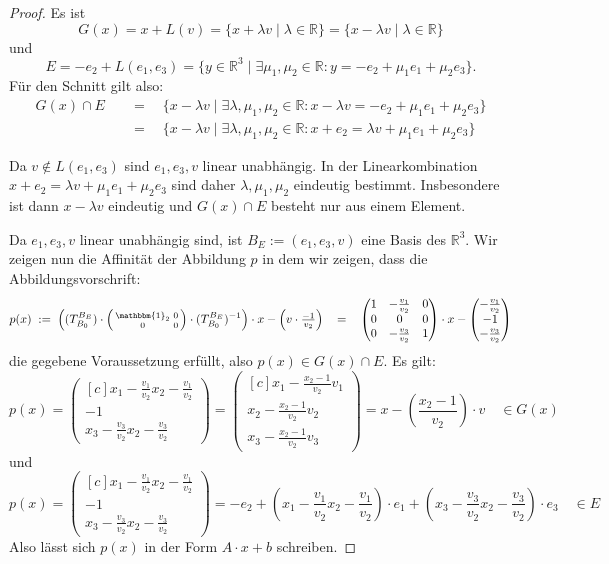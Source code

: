 \documentclass{article}
\newcommand{\RR}{\mathbb{R}}
\newcommand{\eq}{\mathbb{\quad = \quad}}
\newcommand{\vect}[1]{\begin{pmatrix*}[c] #1 \end{pmatrix*}}
\begin{document}
\begin{proof}
  Es ist $$G(x) = x + L(v) = \{ x + \lambda v  \;|\;  \lambda \in \RR \}= \{ x - \lambda v  \;|\;  \lambda \in \RR \}$$
  und $$E = -e_2 + L(e_1, e_3) = \{y \in \RR^3  \;|\; \exists\mu_1, \mu_2 \in \RR: y = -e_2 + \mu_1 e_1 + \mu_2 e_3\}.$$
  Für den Schnitt gilt also:
  \begin{align*}
    G(x) \cap E
     & \eq \{x - \lambda v  \;|\; \exists \lambda, \mu_1, \mu_2 \in \RR: x - \lambda v = -e_2 + \mu_1 e_1 + \mu_2 e_3\} \\
     & \eq \{x - \lambda v  \;|\; \exists \lambda, \mu_1, \mu_2 \in \RR: x + e_2 = \lambda v + \mu_1 e_1 + \mu_2 e_3\}
  \end{align*}

  Da $v \notin L(e_1,e_3)$ sind $e_1, e_3, v$ linear unabhängig.
  In der Linearkombination $x + e_2 = \lambda v + \mu_1 e_1 + \mu_2 e_3$
  sind daher $\lambda, \mu_1, \mu_2$ eindeutig bestimmt.
  Insbesondere ist dann $x - \lambda v$ eindeutig und
  $G(x) \cap E$ besteht nur aus einem Element.

  \bigbreak
  Da $e_1, e_3, v$ linear unabhängig sind, ist $B_E := (e_1, e_3, v)$
  eine Basis des $\RR^3$.
  Wir zeigen nun die Affinität der Abbildung $p$ in dem wir zeigen,
  dass die Abbildungsvorschrift:
  \[
    p(x) \;:=\; \left((T^{B_E}_{B_0}) \cdot
    \begin{psmallmatrix*}[c]
      \mathbbm{1}_2 & 0 \\ 0 & 0
    \end{psmallmatrix*}
    \cdot (T^{B_E}_{B_0})^{-1}\right) \cdot x - \left(v\cdot \tfrac{-1}{v_2}\right)
    \eq \begin{pmatrix*}
      1 & -\frac{v_1}{v_2} & 0 \\
      0 & 0 & 0 \\
      0 & -\frac{v_3}{v_2} & 1
    \end{pmatrix*}
    \cdot x - \vect{ -\frac{v_1}{v_2} \\ -1 \\ -\frac{v_3}{v_2}}
  \]
  die gegebene Voraussetzung erfüllt, also $p(x) \in G(x) \cap E$.
  Es gilt:
  \[
    p(x) = \vect{x_1 - \frac{v_1}{v_2}x_2 -\frac{v_1}{v_2}\\  -1  \\  x_3-\frac{v_3}{v_2} x_2-\frac{v_3}{v_2}} =
    \vect{x_1 - \frac{x_2-1}{v_2} v_1\\  x_2 - \frac{x_2-1}{v_2} v_2  \\  x_3 - \frac{x_2-1}{v_2} v_3} =
    x - \left(\frac{x_2-1}{v_2}\right) \cdot v \quad\in G(x)
  \]
  und
  \[
    p(x) = \vect{x_1 - \frac{v_1}{v_2}x_2 -\frac{v_1}{v_2}\\  -1  \\  x_3-\frac{v_3}{v_2} x_2-\frac{v_3}{v_2}} =
    -e_2 + \left(x_1 - \frac{v_1}{v_2}x_2 -\frac{v_1}{v_2}\right) \cdot e_1 + \left(x_3-\frac{v_3}{v_2} x_2-\frac{v_3}{v_2}\right) \cdot e_3
    \quad\in E
  \]
  Also lässt sich $p(x)$ in der Form $A \cdot x + b$ schreiben.
\end{proof}
\end{document}

